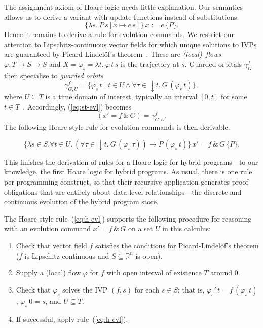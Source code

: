 \documentclass[envcountsame]{llncs}
\newcommand{\flow}{\varphi}
\newcommand{\reals}{\mathbb{R}}
\newcommand\notein[3]{\todo[inline,linecolor=orange!80!black,backgroundcolor=#2!20]{#1: #3}%
}
\newcommand{\gin}[1]{\notein{{\bf GS}}{gcolor}{#1}}
\begin{document}
The assignment axiom of Hoare logic needs little explanation. Our
semantics allows us to derive a variant with update functions instead
of substitutions:
\begin{equation}
\{\lambda s.\ P\, s[x\mapsto e\, s]\}\,  x:=e\, \{P\}. \label{eq:h-assgn}\tag{h-assgn}
\end{equation}
Hence it remains to derive a rule for evolution commands.  We restrict
our attention to Lipschitz-continuous vector fields for which unique
solutions to IVPs are guaranteed by Picard-Lindel\"of's
theorem~\cite{Hirsch09,Teschl12}.  These are \emph{(local)\ flows}
$\flow:T\to S\to S$ and $X=\flow_s=\lambda t.\ \flow\, t\, s$ is the
trajectory at $s$. Guarded orbitals $\gamma^f_G$  then specialise to
\emph{guarded orbits}
\begin{equation*}
  \gamma^f_{G,U} = \{\flow_s\, t\mid t\in U\land \forall\tau \in
  {\downarrow}t.\ G\, (\flow_s\, t)\},
\end{equation*}
where $U\subseteq T$ is a time domain of interest, typically an
interval $[0,t]$ for some $t\in T$~\cite{MuniveS19}.  Accordingly,
(\ref{eq:st-evl}) becomes
\begin{equation}
  (x' = f\, \&\, G)= \gamma^f_{G,U}.\label{eq:st-evl-flow}\tag{st-evl-flow}
\end{equation}
The following Hoare-style rule for evolution commands is then
derivable.
\begin{lemma}\label{P:h-evl-lemma}
\gin{add the right conditions}
\begin{equation}
\{\lambda s\in S.\forall t\in U.\ (\forall
\tau\in {\downarrow}t.\ G\, (\flow_s\, \tau)) \rightarrow P\,
(\flow_s\, t)\}\, x' = f\, \&\, G\, \{P\}. \label{eq:h-evl}\tag{h-evl}
\end{equation}
\end{lemma}

This finishes the derivation of rules for a Hoare logic for hybrid
programs---to our knowledge, the first Hoare logic for hybrid
programs. As usual, there is one rule per programming construct, so
that their recursive application generates proof obligations that are
entirely about data-level relationships---the discrete and continuous
evolution of the hybrid program store.

The Hoare-style rule~(\ref{eq:h-evl}) supports the following procedure
for reasoning with an evolution command $x' = f\, \&\, G$ on a set $U$
in this calculus:
\begin{enumerate}
\item Check that vector field $f$ satisfies the conditions for
  Picard-Lindel\"of's theorem ($f$ is Lipschitz continuous and
  $S\subseteq\reals^n$ is open).
\item Supply a (local) flow $\flow$ for $f$ with open interval of
  existence $T$ around $0$.
\item Check that $\flow_s$ solves the IVP $(f,s)$ for each $s\in S$;
  that is, $\flow_s'\, t = f\, (\flow_s\, t)$, $\flow_s\, 0 = s$, and
  $U\subseteq T$.
\item If successful, apply rule~(\ref{eq:h-evl}).
\end{enumerate}
\end{document}
